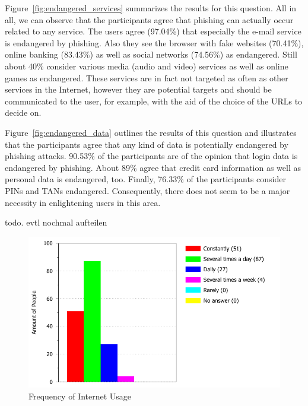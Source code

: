 \begin{description}[leftmargin=0cm]
	\item[Services endangered by phishing] Figure~\ref{fig:endangered_services} summarizes the results for this question.
 All in all, we can observe that the participants agree that phishing can actually occur related to any service.
 The users agree (97.04\%) that especially the e-mail service is endangered by phishing.
 Also they see the browser with fake websites (70.41\%), online banking (83.43\%) as well as social networks (74.56\%) as endangered.
 Still about 40\% consider various media (audio and video) services as well as online games as endangered.
 These services are in fact not targeted as often as other services in the Internet, however they are potential targets and should be communicated to the user, for example, with the aid of the choice of the URLs to decide on.

	\item[Data endangered by phishing] Figure~\ref{fig:endangered_data} outlines the results of this question and illustrates that the participants agree that any kind of data is potentially endangered by phishing attacks.
 90.53\% of the participants are of the opinion that login data is endangered by phishing.
 About 89\% agree that credit card information as well as personal data is endangered, too.
 Finally, 76.33\% of the participants consider PINs and TANs endangered.
 Consequently, there does not seem to be a major necessity in enlightening users in this area.

	\item[Preferences for an education app] todo.
 evtl nochmal aufteilen
\end{description}


\begin{figure}[hHtbp]
\centering
\includegraphics[width=1.0\textwidth]{graphix/201_Frequency_of_Internet_Usage.pdf}
\caption{Frequency of Internet Usage}
\label{fig:internet_usage}
\end{figure}


